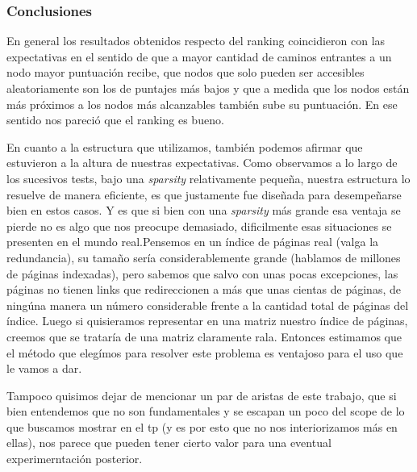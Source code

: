 \subsubsection*{Conclusiones}

En general los resultados obtenidos respecto del ranking coincidieron con las expectativas en el sentido de que a mayor cantidad de caminos entrantes a un nodo mayor puntuación recibe, que nodos que solo pueden ser accesibles aleatoriamente son los de puntajes más bajos y que a medida  que los nodos están más próximos a los nodos más alcanzables también sube su puntuación. En ese sentido nos pareció que el ranking es bueno.\\
\begin{comment}
Por supuesto asumiendo que en un caso real la cantidad de links hacia una página efectivamente responda a que su contenido es valioso para los usuarios. Lo cual es un aspecto que está totalmente fuera de evaluación en este caso.
\end{comment}

\par
En cuanto a la estructura que utilizamos, tambi\'en podemos  afirmar que estuvieron a la altura de nuestras expectativas. Como observamos a lo largo de los sucesivos tests, bajo una \textit{sparsity} relativamente pequeña, nuestra estructura lo resuelve de manera eficiente, es que justamente fue diseñada para desempeñarse bien en estos casos.\newline
Y es que si bien con una \textit{sparsity} m\'as grande esa ventaja se pierde no es algo que nos preocupe demasiado, dificilmente esas situaciones se presenten en el mundo real.\newline Pensemos en un \'indice de p\'aginas real (valga la redundancia), su tamaño ser\'ia considerablemente grande (hablamos de millones de p\'aginas indexadas), pero sabemos que salvo con unas pocas excepciones, las p\'aginas no tienen links que redireccionen a m\'as que unas cientas de p\'aginas, de ning\'una manera un n\'umero considerable frente a la cantidad total de p\'aginas del \'indice.\newline
Luego si quisieramos representar en una matriz nuestro \'indice de p\'aginas, creemos que se tratar\'ia de una matriz claramente rala.\newline
Entonces estimamos que el m\'etodo que eleg\'imos para resolver este problema es ventajoso para el uso que le vamos a dar.
\\
\par 
Tampoco quisimos dejar de mencionar un par de aristas de este trabajo, que si bien entendemos que no son fundamentales y se escapan un poco del scope de lo que buscamos mostrar en el tp (y es por esto que no nos interiorizamos m\'as en ellas), nos parece que pueden tener cierto valor para una eventual experimerntaci\'on posterior.\newline

